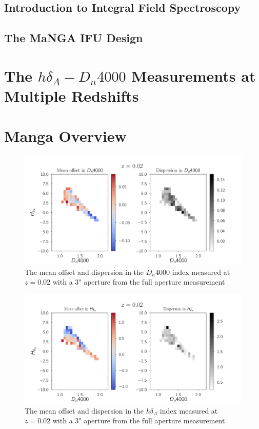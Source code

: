 \subsection{Introduction to Integral Field Spectroscopy}

\subsection{The MaNGA IFU Design}

\section{The $h\delta_{A}-D_{n}4000$ Measurements at Multiple Redshifts}
\section{Manga Overview}
\begin{figure}
\includegraphics[width=\textwidth]{figures/zb.pdf}
\caption[Short figure name.]{ The mean offset and dispersion in the $D_{n}4000$ index measured at $z = 0.02$ with a $3$" aperture from the full aperture measurement
\label{fig:myInlineFigure}}
\end{figure}

\begin{figure}
\includegraphics[width=\textwidth]{figures/zc.pdf}
\caption[Short figure name.]{ The mean offset and dispersion in the $h\delta_{A}$ index measured at $z = 0.02$ with a $3$" aperture from the full aperture measurement 
\label{fig:myInlineFigure}}
\end{figure}

